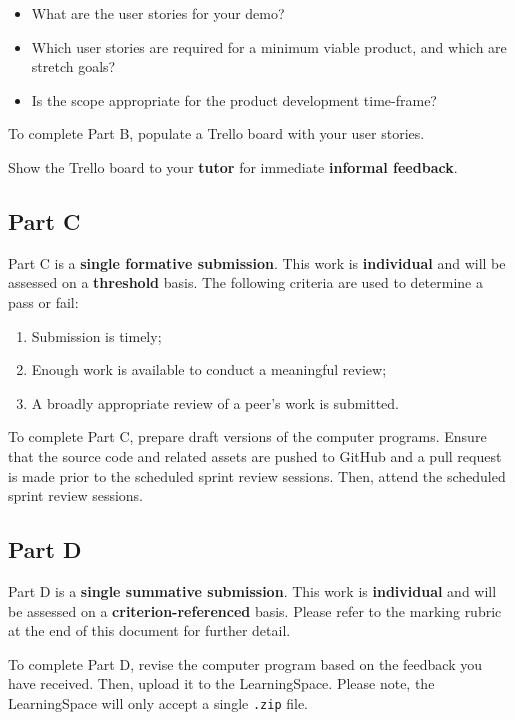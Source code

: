 \documentclass{../../fal_assignment}
\begin{document}
\begin{itemize}
	\item What are the user stories for your demo?
	\item Which user stories are required for a minimum viable product, and which are stretch goals?
	\item Is the scope appropriate for the product development time-frame?
\end{itemize}

To complete Part B, populate a Trello board with your user stories.

Show the Trello board to your \textbf{tutor} for immediate \textbf{informal feedback}.

\subsection*{Part C}

Part C is a \textbf{single formative submission}. This work is \textbf{individual} and will be assessed on a \textbf{threshold} basis. The following criteria are used to determine a pass or fail:

\begin{enumerate}[label=(\alph*)]
	\item Submission is timely;
	\item Enough work is available to conduct a meaningful review;
	\item A broadly appropriate review of a peer's work is submitted.
\end{enumerate}

To complete Part C, prepare draft versions of the computer programs. Ensure that the source code and related assets are pushed to GitHub and a pull request is made prior to the scheduled sprint review sessions. Then, attend the scheduled sprint review sessions.

\subsection*{Part D}

Part D is a \textbf{single summative submission}. This work is \textbf{individual} and will be assessed on a \textbf{criterion-referenced} basis. Please refer to the marking rubric at the end of this document for further detail.

To complete Part D, revise the computer program based on the feedback you have received. Then, upload it to the LearningSpace. Please note, the LearningSpace will only accept a single \texttt{.zip} file.
\end{document}
